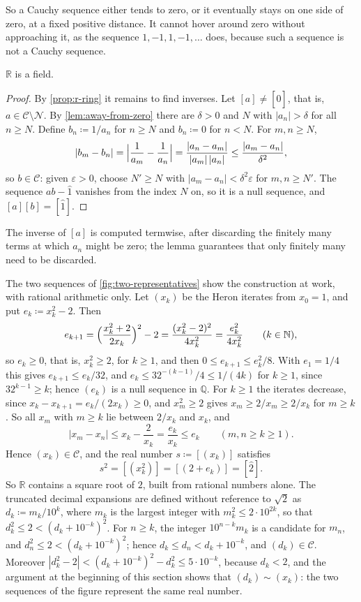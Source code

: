 So a Cauchy sequence either tends to zero, or it eventually stays on one side of zero, at a fixed positive distance. It cannot hover around zero without approaching it, as the sequence $1,-1,1,-1,\ldots$ does, because such a sequence is not a Cauchy sequence.

\begin{theorem}
\label{thm:r-field}
$\mathbb R$ is a field.
\end{theorem}

\begin{proof}
By \cref{prop:r-ring} it remains to find inverses. Let $[a]\ne[\hat0]$, that is, $a\in\mathcal C\setminus\mathcal N$. By \cref{lem:away-from-zero} there are $\delta>0$ and $N$ with $|a_n|>\delta$ for all $n\ge N$. Define $b_n\coloneqq1/a_n$ for $n\ge N$ and $b_n\coloneqq0$ for $n<N$. For $m,n\ge N$,
\[
|b_m-b_n|=\Bigl|\frac1{a_m}-\frac1{a_n}\Bigr|=\frac{|a_n-a_m|}{|a_m|\,|a_n|}\le\frac{|a_m-a_n|}{\delta^2},
\]
so $b\in\mathcal C$: given $\varepsilon>0$, choose $N'\ge N$ with $|a_m-a_n|<\delta^2\varepsilon$ for $m,n\ge N'$. The sequence $ab-\hat1$ vanishes from the index $N$ on, so it is a null sequence, and $[a][b]=[\hat1]$.
\end{proof}

The inverse of $[a]$ is computed termwise, after discarding the finitely many terms at which $a_n$ might be zero; the lemma guarantees that only finitely many need to be discarded.

The two sequences of \cref{fig:two-representatives} show the construction at work, with rational arithmetic only. Let $(x_k)$ be the Heron iterates from $x_0=1$, and put $e_k\coloneqq x_k^2-2$. Then
\[
e_{k+1}=\Bigl(\frac{x_k^2+2}{2x_k}\Bigr)^2-2=\frac{(x_k^2-2)^2}{4x_k^2}=\frac{e_k^2}{4x_k^2}\qquad(k\in\mathbb N),
\]
so $e_k\ge0$, that is, $x_k^2\ge2$, for $k\ge1$, and then $0\le e_{k+1}\le e_k^2/8$. With $e_1=1/4$ this gives $e_{k+1}\le e_k/32$, and $e_k\le32^{-(k-1)}/4\le1/(4k)$ for $k\ge1$, since $32^{k-1}\ge k$; hence $(e_k)$ is a null sequence in $\mathbb Q$. For $k\ge1$ the iterates decrease, since $x_k-x_{k+1}=e_k/(2x_k)\ge0$, and $x_m^2\ge2$ gives $x_m\ge2/x_m\ge2/x_k$ for $m\ge k$. So all $x_m$ with $m\ge k$ lie between $2/x_k$ and $x_k$, and
\[
|x_m-x_n|\le x_k-\frac2{x_k}=\frac{e_k}{x_k}\le e_k\qquad(m,n\ge k\ge1) .
\]
Hence $(x_k)\in\mathcal C$, and the real number $s\coloneqq[(x_k)]$ satisfies
\[
s^2=[(x_k^2)]=[(2+e_k)]=[\hat2] .
\]
So $\mathbb R$ contains a square root of $2$, built from rational numbers alone. The truncated decimal expansions are defined without reference to $\sqrt2$ as $d_k\coloneqq m_k/10^k$, where $m_k$ is the largest integer with $m_k^2\le2\cdot10^{2k}$, so that $d_k^2\le2<(d_k+10^{-k})^2$. For $n\ge k$, the integer $10^{n-k}m_k$ is a candidate for $m_n$, and $d_n^2\le2<(d_k+10^{-k})^2$; hence $d_k\le d_n<d_k+10^{-k}$, and $(d_k)\in\mathcal C$. Moreover $|d_k^2-2|<(d_k+10^{-k})^2-d_k^2\le5\cdot10^{-k}$, because $d_k<2$, and the argument at the beginning of this section shows that $(d_k)\sim(x_k)$: the two sequences of the figure represent the same real number.

